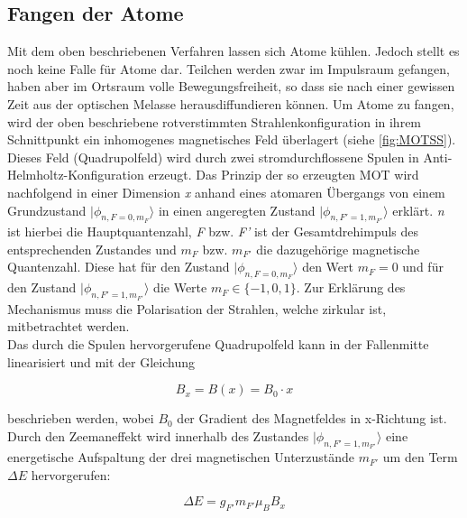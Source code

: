 \documentclass[
class=book,
accentcolor=1b,
custommargins=geometry,
fontsize=11pt,
thesis={type=Versuchsanleitung},
ruledheaders=all,
headline=false,
instbox=false,
marginpar=false,
title=small,
ignore-missing-data=true,
twoside=false,
pdfa=false %
]{apqpub}
\begin{document}
				\subsection{Fangen der Atome}
				
				Mit dem oben beschriebenen Verfahren lassen sich Atome kühlen. Jedoch stellt es noch keine Falle für Atome dar. Teilchen werden zwar im Impulsraum gefangen, haben aber im Ortsraum volle Bewegungsfreiheit, so dass sie nach einer gewissen Zeit aus der optischen Melasse herausdiffundieren können. Um Atome zu fangen, wird der oben beschriebene rotverstimmten Strahlenkonfiguration in ihrem Schnittpunkt ein inhomogenes magnetisches Feld überlagert (siehe \autoref{fig:MOTSS}). Dieses Feld (Quadrupolfeld) wird durch zwei stromdurchflossene Spulen in Anti-Helmholtz-Konfiguration erzeugt. Das Prinzip der so erzeugten MOT wird nachfolgend in einer Dimension \textit{x} anhand eines atomaren Übergangs von einem Grundzustand $\lvert \phi_{n,F=0,m_F}\rangle$ in einen angeregten Zustand $\lvert \phi_{n,F'=1,m_{F'}}\rangle$ erklärt.
				\textit{n} ist hierbei die Hauptquantenzahl, \textit{F} bzw. \textit{F'} ist der Gesamtdrehimpuls des entsprechenden Zustandes und $m_F$ bzw. $m_{F'}$ die dazugehörige magnetische Quantenzahl. Diese hat für den Zustand $\lvert \phi_{n,F=0,m_F}\rangle$ den Wert $m_F=0$ und für den Zustand $\lvert \phi_{n,F'=1,m_{F'}}\rangle$ die Werte $m_F \in \{-1,0,1\}$. Zur Erklärung des Mechanismus muss die Polarisation der Strahlen, welche zirkular ist, mitbetrachtet werden.\\
				Das durch die Spulen hervorgerufene Quadrupolfeld kann in der Fallenmitte linearisiert und mit der Gleichung
				
				\begin{equation}
				B_x = B(x) = B_0 \cdot x
				\end{equation}
				
				beschrieben werden, wobei $B_0$ der Gradient des Magnetfeldes in x-Richtung ist. Durch den Zeemaneffekt wird innerhalb des Zustandes $\lvert \phi_{n,F'=1,m_{F'}}\rangle$ eine energetische Aufspaltung der drei magnetischen Unterzustände $m_{F'}$ um den Term $\varDelta E$ hervorgerufen:
				
				\begin{equation}
				\varDelta E = g_{F'} m_{F'} \mu_B B_x
				\end{equation}
				
\end{document}
